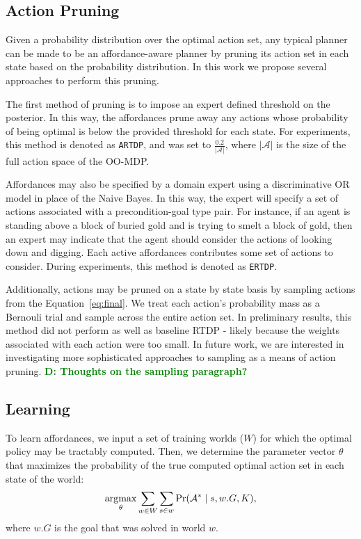 \documentclass[conference]{IEEEtran}
\newcommand{\dnote}[1]{\textcolor{Green}{\textbf{D: #1}}}
\newcommand{\argmax}{\operatornamewithlimits{argmax}}
\begin{document}
\subsection{Action Pruning}
\label{sec:action_pruning}
Given a probability distribution over the optimal action set, any typical
planner can be made to be an affordance-aware planner by pruning its action
set in each state based on the probability distribution. In this work we propose several approaches to perform this pruning.

The first method of pruning is to impose an expert defined threshold on the posterior. In this way, the affordances prune away any actions whose probability of being optimal is below the provided threshold for each state. For experiments, this method is denoted as \texttt{ARTDP}, and was set to $\frac{0.2}{|\mathcal{A}|}$, where $|\mathcal{A}|$ is the size of the full action space of the OO-MDP.

Affordances may also be specified by a domain expert using a discriminative OR model in place of the Naive Bayes. In this way, the expert will specify a set of actions associated with a precondition-goal type pair. For instance, if an agent is standing above a block of buried gold and is trying to smelt a block of gold, then an expert may indicate that the agent should consider the actions of looking down and digging. Each active affordances contributes some set of actions to consider. During experiments, this method is denoted as \texttt{ERTDP}.

Additionally, actions may be pruned on a state by state basis by sampling actions from the Equation~\ref{eq:final}. We treat each action's probability mass as a Bernouli trial and sample across the entire action set. In preliminary results, this method did not perform as well as baseline RTDP - likely because the weights associated with each action were too small. In future work, we are interested in investigating more sophisticated approaches to sampling as a means of action pruning.
\dnote{Thoughts on the sampling paragraph?}


\subsection{Learning}

To learn affordances, we input a set of training worlds ($W$) for which the optimal policy
may be tractably computed. Then, we determine the parameter vector $\theta$ that 
maximizes the probability of the true computed optimal action set in each state of the world:
\begin{equation}
\argmax_\theta \sum_{w \in W} \sum_{s \in w} \Pr(\mathcal{A}^* \mid s, w.G, K),
\end{equation}
where $w.G$ is the goal that was solved in world $w$.
\end{document}
